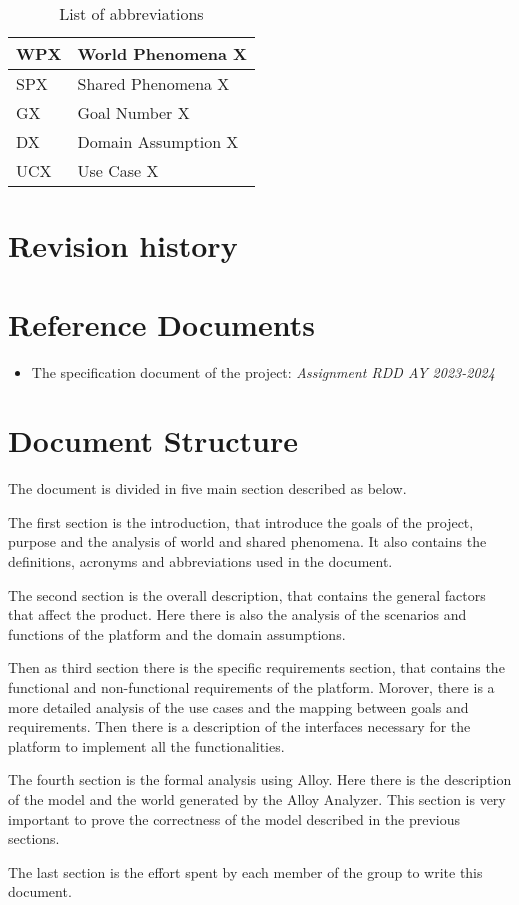 \begin{table}[H]
  \begin{tabular}{|l|l|}

    \hline
    WPX & World Phenomena X    \\
    \hline
    SPX & Shared Phenomena X    \\
    \hline
    GX & Goal Number X    \\
    \hline
    DX & Domain Assumption X    \\
    \hline
    UCX & Use Case X    \\
    \hline

  \end{tabular}
  \caption{List of abbreviations}
  \label{tab:abbreviations}
\end{table}



\section{Revision history}
\label{s:Revision_history}%


\section{Reference Documents}
\label{s:Reference_documents}%

\begin{itemize}
  \item The specification document of the project: \textit{Assignment RDD AY 2023-2024}
\end{itemize}

\section{Document Structure}
\label{s:Document_Structure}%

The document is divided in five main section described as below.

The first section is the introduction, that introduce the goals of the project, purpose and the analysis of world and shared phenomena. It also contains the definitions, acronyms and abbreviations used in the document. 

The second section is the overall description, that contains the general factors that affect the product. Here there is also the analysis of the scenarios and functions of the platform and the domain assumptions.

Then as third section there is the specific requirements section, that contains the functional and non-functional requirements of the platform. Morover, there is a more detailed analysis of the use cases and the mapping between goals and requirements. Then there is a description of the interfaces necessary for the platform to implement all the functionalities.

The fourth section is the formal analysis using Alloy. Here there is the description of the model and the world generated by the Alloy Analyzer. This section is very important to prove the correctness of the model described in the previous sections.

The last section is the effort spent by each member of the group to write this document.